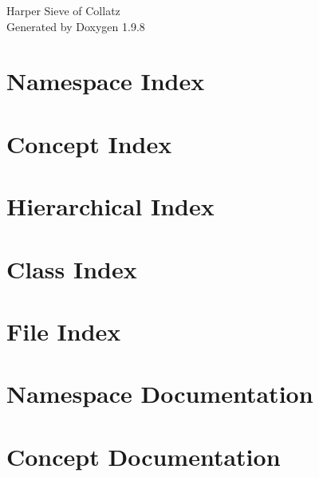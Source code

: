 \documentclass[twoside]{book}
\newcommand{\+}{\discretionary{\mbox{\scriptsize$\hookleftarrow$}}{}{}}
\newcommand{\clearemptydoublepage}{%
    \newpage{\pagestyle{empty}\cleardoublepage}%
  }
\begin{document}
  \raggedbottom
    \hypersetup{pageanchor=false,
                bookmarksnumbered=true,
                pdfencoding=unicode
               }
  \begin{titlepage}
  \vspace*{7cm}
  \begin{center}%
  {\Large Harper Sieve of Collatz}\\
  \vspace*{1cm}
  {\large Generated by Doxygen 1.9.8}\\
  \end{center}
  \end{titlepage}
  \clearemptydoublepage
  \tableofcontents
  \clearemptydoublepage
  \hypersetup{pageanchor=true}

\chapter{Namespace Index}

\chapter{Concept Index}

\chapter{Hierarchical Index}

\chapter{Class Index}

\chapter{File Index}

\chapter{Namespace Documentation}










\chapter{Concept Documentation}







\end{document}
